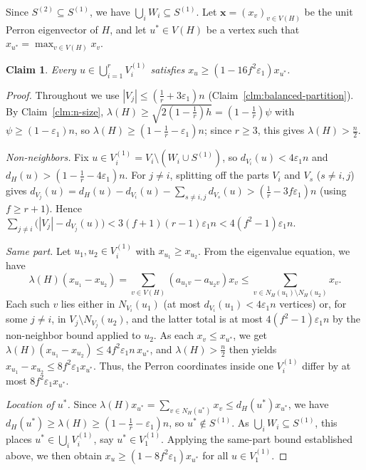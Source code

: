 \documentclass[11pt,a4paper]{article}
\newtheorem{claim}[theorem]{Claim}
\theoremstyle{definition}
\theoremstyle{plain}
\newcommand{\eps}{\varepsilon}
\renewcommand{\le}{\leqslant}
\renewcommand{\ge}{\geqslant}
\begin{document}
Since $S^{(2)}\subseteq S^{(1)}$, we have $\bigcup_iW_i\subseteq S^{(1)}$. 
Let $\bm{x}=(x_v)_{v\in V(H)}$ be the unit Perron eigenvector of $H$, and 
let $u^*\in V(H)$ be a vertex such that $x_{u^*}=\max_{v\in V(H)} x_v$. 

\begin{claim}\label{clm:perron-almost-constant}
Every $u\in\bigcup_{i=1}^r V_i^{(1)}$ satisfies
$x_u\ge(1-16f^2\eps_1)x_{u^\ast}$.
\end{claim}

\begin{proof}
Throughout we use $|V_j|\le(\tfrac1r+3\eps_1)n$
(Claim~\ref{clm:balanced-partition}). By Claim~\ref{clm:n-size},
$\lambda(H)\ge\sqrt{2(1-\tfrac1r)h}=(1-\tfrac1r)\psi$ with
$\psi\ge(1-\eps_1)n$, so
$\lambda(H)\ge(1-\tfrac1r-\eps_1)n$; since $r\ge3$, this
gives $\lambda(H)>\tfrac n2$.

\emph{Non-neighbors.} Fix
$u\in V_i^{(1)}=V_i\setminus(W_i\cup S^{(1)})$, so
$d_{V_i}(u)<4\eps_1n$ and $d_H(u)>(1-\tfrac1r-4\eps_1)n$.
For $j\ne i$, splitting off the parts $V_i$ and $V_s$
($s\ne i,j$) gives
$d_{V_j}(u)=d_H(u)-d_{V_i}(u)-\sum_{s\ne i,j}d_{V_s}(u)
>(\tfrac1r-3f\eps_1)n$ (using $f\ge r+1$). 
Hence
$
  \sum_{j\ne i}\bigl(|V_j|-d_{V_j}(u)\bigr)
  <3(f+1)(r-1)\eps_1n<4(f^2-1)\eps_1n$.

\emph{Same part.} Let $u_1,u_2\in V_i^{(1)}$ with
$x_{u_1}\ge x_{u_2}$. From the eigenvalue equation, we have 
$$\lambda(H)(x_{u_1}-x_{u_2})
=\sum_{v\in V(H)}(a_{u_1v}-a_{u_2v})x_v
\le\sum_{v\in N_H(u_1)\setminus N_H(u_2)}x_v.$$
Each such $v$ lies either in $N_{V_i}(u_1)$ (at most
$d_{V_i}(u_1)<4\eps_1n$ vertices) or, for some $j\ne i$, in
$V_j\setminus N_{V_j}(u_2)$, and the latter total is at
most $4(f^2-1)\eps_1n$ by the non-neighbor bound applied to
$u_2$. As each $x_v\le x_{u^\ast}$, we get
$\lambda(H)(x_{u_1}-x_{u_2})\le4f^2\eps_1n\,x_{u^\ast}$, and
$\lambda(H)>\tfrac n2$ then yields
$x_{u_1}-x_{u_2}\le8f^2\eps_1x_{u^\ast}$. Thus, the Perron
coordinates inside one $V_i^{(1)}$ differ by at most
$8f^2\eps_1x_{u^\ast}$.

\emph{Location of $u^\ast$.} Since
$\lambda(H)x_{u^\ast}=\sum_{v\in N_H(u^\ast)}x_v
\le d_H(u^\ast)x_{u^\ast}$, we have
$d_H(u^\ast)\ge\lambda(H)\ge(1-\tfrac1r-\eps_1)n$, so
$u^\ast\notin S^{(1)}$. As $\bigcup_iW_i\subseteq S^{(1)}$,
this places $u^\ast\in\bigcup_iV_i^{(1)}$, say
$u^\ast\in V_1^{(1)}$. 
Applying the same-part bound established above,  
we then obtain 
$x_u\ge(1-8f^2\eps_1)x_{u^\ast}$ for all $u\in V_1^{(1)}$.


\end{proof}
\end{document}
